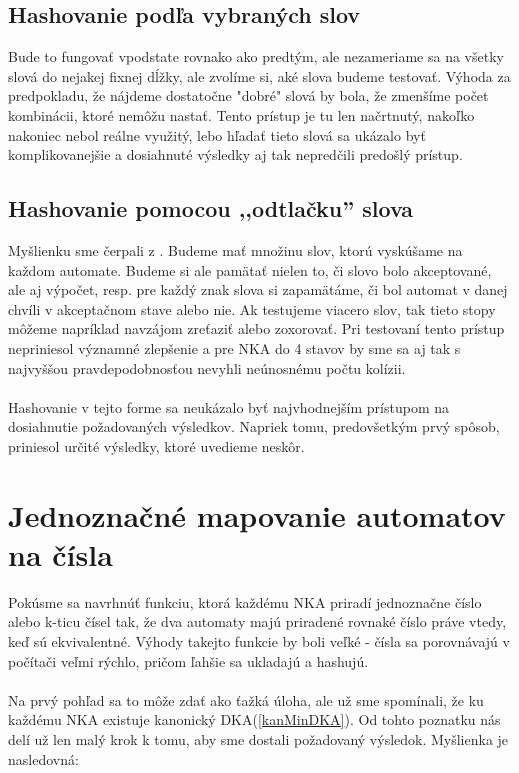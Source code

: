 \subsection{Hashovanie podľa vybraných slov}
Bude to fungovať vpodstate rovnako ako predtým, ale nezameriame sa na všetky slová do nejakej fixnej dĺžky, ale zvolíme si, aké slova budeme testovať. Výhoda za predpokladu, že nájdeme dostatočne "dobré" slová by bola, že zmenšíme počet kombinácii, ktoré nemôžu nastať. Tento prístup je tu len načrtnutý, nakoľko nakoniec nebol reálne využitý, lebo hľadať tieto slová sa ukázalo byť komplikovanejšie a dosiahnuté výsledky aj tak nepredčili predošlý prístup.

\subsection{Hashovanie pomocou ,,odtlačku'' slova}
Myšlienku sme čerpali z \cite{petruchova}. Budeme mať množinu slov, ktorú vyskúšame na každom automate. Budeme si ale pamätať nielen to, či slovo bolo akceptované, ale aj výpočet, resp. pre každý znak slova si zapamätáme, či bol automat v danej chvíli v akceptačnom stave alebo nie. Ak testujeme viacero slov, tak tieto stopy môžeme napríklad navzájom zreťaziť alebo zoxorovať. Pri testovaní tento prístup nepriniesol významné zlepšenie a pre NKA do 4 stavov by sme sa aj tak s najvyššou pravdepodobnosťou nevyhli neúnosnému počtu kolízii.

\paragraph{}
Hashovanie v tejto forme sa neukázalo byť najvhodnejším prístupom na dosiahnutie požadovaných výsledkov. Napriek tomu, predovšetkým prvý spôsob, priniesol určité výsledky, ktoré uvedieme neskôr.

\label{mapCis}
\section{Jednoznačné mapovanie automatov na čísla}

Pokúsme sa navrhnúť funkciu, ktorá každému NKA priradí jednoznačne číslo alebo k-ticu čísel tak, že dva automaty majú priradené rovnaké číslo práve vtedy, keď sú ekvivalentné. Výhody takejto funkcie by boli veľké - čísla sa porovnávajú v počítači veľmi rýchlo, pričom ľahšie sa ukladajú a hashujú. 
\paragraph{}
Na prvý pohľad sa to môže zdať ako ťažká úloha, ale už sme spomínali, že ku každému NKA existuje kanonický DKA(\ref{kanMinDKA}). Od tohto poznatku nás delí už len malý krok k tomu, aby sme dostali požadovaný výsledok. Myšlienka je nasledovná:
